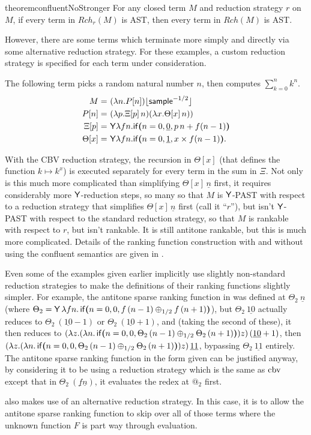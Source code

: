 \begin{restatable}{theorem}{confluentNoStronger}
For any closed term $M$ and reduction strategy $r$ on $M$, if every term in $\mathit{Rch}_r(M)$ is AST, then every term in $\mathit{Rch}(M)$ is AST.
\end{restatable}

However, there are some terms which terminate more simply and directly via some alternative reduction strategy. For these examples, a custom reduction strategy is specified for each term under consideration.

\begin{example} \label{ex:sum of powers}
The following term picks a random natural number $n$, then computes $\sum_{k=0}^n k^n$.
\begin{align*}
M =&\ (\lambda n. P[n]) \lfloor \mathsf{sample}^{-1/2} \rfloor \\
P[n] =&\ (\lambda p. \Xi[p] \, n) (\lambda x. \Theta[x] \, n)) \\
\Xi[p] =&\ \mathsf{Y} \lambda f n. \mathsf{if}\boldsymbol{(}n = 0, \underline 0, p \, n + f (n-1)\boldsymbol{)} \\
\Theta[x] =&\ \mathsf{Y} \lambda f n. \mathsf{if}\boldsymbol{(}n = 0, \underline 1, x \times f (n-1)\boldsymbol{)}.
\end{align*}

With the CBV reduction strategy, the recursion in $\Theta[x]$ (that defines the function $k \mapsto k^x$) is executed separately for every term in the sum in $\Xi$. Not only is this much more complicated than simplifying $\Theta[x] \, \underline n$ first, it requires considerably more $\mathsf{Y}$-reduction steps, so many so that $M$ is $\mathsf{Y}$-PAST with respect to a reduction strategy that simplifies $\Theta[x] \, \underline n$ first (call it ``$r$''), but isn't $\mathsf{Y}$-PAST with respect to the standard reduction strategy, so that $M$ is rankable with respect to $r$, but isn't rankable. It is still antitone rankable, but this is much more complicated. Details of the ranking function construction with and without using the confluent semantics are given in .
\end{example}

Even some of the examples given earlier implicitly use slightly non-standard reduction strategies to make the definitions of their ranking functions slightly simpler. For example, the antitone sparse ranking function in  was defined at $\Theta_2\ \underline n$ (where $\Theta_2 = \mathsf{Y} \, \lambda f n . \, \mathsf{if}\boldsymbol{(}n = 0, 0, f \, (n - 1) \oplus_{1/2} f \, (n + 1)\boldsymbol{)}$), but $\Theta_2\ \underline{10}$ actually reduces to $\Theta_2\ (\underline{10} - 1)$ or $\Theta_2\ (\underline{10} + 1)$, and (taking the second of these), it then reduces to $(\lambda z. (\lambda n. \, \mathsf{if}\boldsymbol{(}n = 0, 0, \Theta_2 \, (n - 1) \oplus_{1/2} \Theta_2 \, (n + 1)\boldsymbol{)}) z) \, (\underline{10} + 1)$, then $(\lambda z. (\lambda n. \, \mathsf{if}\boldsymbol{(}n = 0, 0, \Theta_2 \, (n - 1) \oplus_{1/2} \Theta_2 \, (n + 1)\boldsymbol{)}) z) \, \underline{11}$, bypassing $\Theta_2\ \underline{11}$ entirely. The antitone sparse ranking function in the form given can be justified anyway, by considering it to be using a reduction strategy which is the same as $\operatorname{cbv}$ except that in $\Theta_2\ (\underline f \underline n)$, it evaluates the redex at $@_2$ first.

 also makes use of an alternative reduction strategy. In this case, it is to allow the antitone sparse ranking function to skip over all of those terms where the unknown function $F$ is part way through evaluation.
